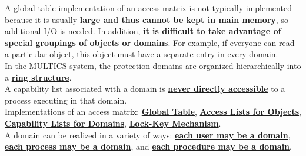 \documentclass[12pt]{article}
\newcommand{\qw}[1]{\textbf{\ul{#1}}}
\begin{document}
A global table implementation of an access matrix is not typically implemented because it is usually \qw{large and thus cannot be kept in main memory}, so additional I/O is needed. In addition, \qw{it is difficult to take advantage of special groupings of objects or domains}. For example, if everyone can read a particular object, this object must have a separate entry in every domain.\\[2mm]
In the MULTICS system, the protection domains are organized hierarchically into a \qw{ring structure}.\\[2mm]
A capability list associated with a domain is \qw{never directly accessible} to a process executing in that domain.\\[2mm]
Implementations of an access matrix: \qw{Global Table}, \qw{Access Lists for Objects}, \qw{Capability Lists for Domains}, \qw{Lock-Key Mechanism}.\\[2mm]
A domain can be realized in a variety of ways: \qw{each user may be a domain}, \qw{each process may be a domain}, and \qw{each procedure may be a domain}.
\newpage
\end{document}
